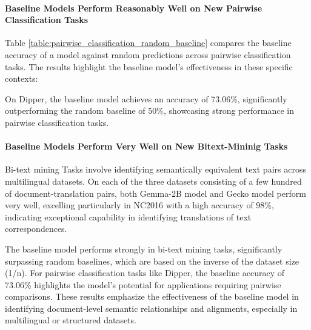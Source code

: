 \paragraph{Baseline Models Perform Reasonably Well on New Pairwise Classification Tasks}
\begin{table}[t!]
\vspace{-1em}
\centering
{}
\caption{Baseline Accuracy for pairwise classification and bi-text mining tasks}
\label{table:pairwise_classification_random_baseline}
\vspace{-1em}
\end{table}

Table \ref{table:pairwise_classification_random_baseline} compares the baseline accuracy of a model against random predictions across pairwise classification tasks. The results highlight the baseline model's effectiveness in these specific contexts:

On Dipper, the baseline model achieves an accuracy of 73.06\%, significantly outperforming the random baseline of 50\%, showcasing strong performance in pairwise classification tasks.

\paragraph{Baseline Models Perform Very Well on New Bitext-Mininig Tasks}

Bi-text mining Tasks involve identifying semantically equivalent text pairs across multilingual datasets. On each of the three datasets consisting of a few hundred of document-translation pairs, both Gemma-2B model and Gecko model perform very well, excelling particularly in NC2016 with a high accuracy of 98\%, indicating exceptional capability in identifying translations of text correspondences. 

The baseline model performs strongly in bi-text mining tasks, significantly surpassing random baselines, which are based on the inverse of the dataset size (1/n).
For pairwise classification tasks like Dipper, the baseline accuracy of 73.06\% highlights the model's potential for applications requiring pairwise comparisons.
These results emphasize the effectiveness of the baseline model in identifying document-level semantic relationships and alignments, especially in multilingual or structured datasets. 
